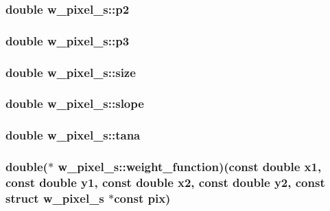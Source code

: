 \hypertarget{structw__pixel__s_ad0db38112e89040778db44f2ed86031c}{
\subsubsection[{p2}]{\setlength{\rightskip}{0pt plus 5cm}double {\bf w\_\-pixel\_\-s::p2}}}
\label{structw__pixel__s_ad0db38112e89040778db44f2ed86031c}
\hypertarget{structw__pixel__s_aa570917e9e9d0ab38a3ec5c1af5ec721}{
\subsubsection[{p3}]{\setlength{\rightskip}{0pt plus 5cm}double {\bf w\_\-pixel\_\-s::p3}}}
\label{structw__pixel__s_aa570917e9e9d0ab38a3ec5c1af5ec721}
\hypertarget{structw__pixel__s_a8b4134dbbe9eb664a1c452fbfcf4b43a}{
\subsubsection[{size}]{\setlength{\rightskip}{0pt plus 5cm}double {\bf w\_\-pixel\_\-s::size}}}
\label{structw__pixel__s_a8b4134dbbe9eb664a1c452fbfcf4b43a}
\hypertarget{structw__pixel__s_ae586b14a26536b2fd7d4fa5fe8cb3ff2}{
\subsubsection[{slope}]{\setlength{\rightskip}{0pt plus 5cm}double {\bf w\_\-pixel\_\-s::slope}}}
\label{structw__pixel__s_ae586b14a26536b2fd7d4fa5fe8cb3ff2}
\hypertarget{structw__pixel__s_a7ec8bd3a93435d8fe1247ecf45f5a54c}{
\subsubsection[{tana}]{\setlength{\rightskip}{0pt plus 5cm}double {\bf w\_\-pixel\_\-s::tana}}}
\label{structw__pixel__s_a7ec8bd3a93435d8fe1247ecf45f5a54c}
\hypertarget{structw__pixel__s_ad04cb41431b0507e691b17c186986caa}{
\subsubsection[{weight\_\-function}]{\setlength{\rightskip}{0pt plus 5cm}double($\ast$ {\bf w\_\-pixel\_\-s::weight\_\-function})(const double x1, const double y1, const double x2, const double y2, const struct {\bf w\_\-pixel\_\-s} $\ast$const pix)}}
